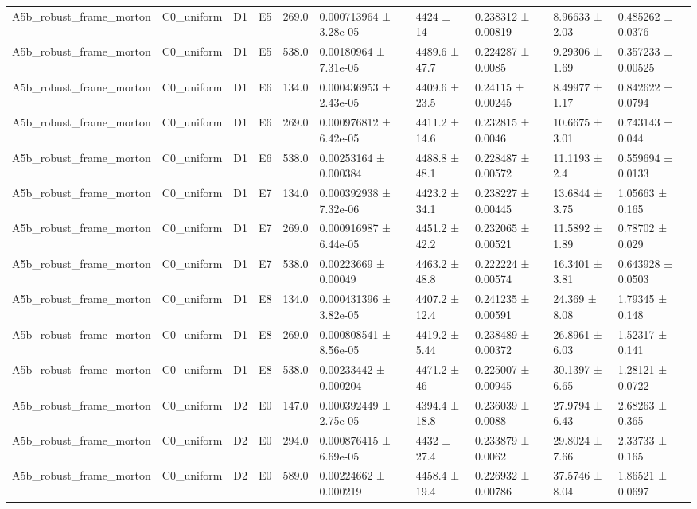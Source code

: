 \begin{table}
\begin{tabular}{llllllllll}
A5b\_robust\_frame\_morton & C0\_uniform & D1 & E5 & 269.0 & 0.000713964 ± 3.28e-05 & 4424 ± 14 & 0.238312 ± 0.00819 & 8.96633 ± 2.03 & 0.485262 ± 0.0376 \\
A5b\_robust\_frame\_morton & C0\_uniform & D1 & E5 & 538.0 & 0.00180964 ± 7.31e-05 & 4489.6 ± 47.7 & 0.224287 ± 0.0085 & 9.29306 ± 1.69 & 0.357233 ± 0.00525 \\
A5b\_robust\_frame\_morton & C0\_uniform & D1 & E6 & 134.0 & 0.000436953 ± 2.43e-05 & 4409.6 ± 23.5 & 0.24115 ± 0.00245 & 8.49977 ± 1.17 & 0.842622 ± 0.0794 \\
A5b\_robust\_frame\_morton & C0\_uniform & D1 & E6 & 269.0 & 0.000976812 ± 6.42e-05 & 4411.2 ± 14.6 & 0.232815 ± 0.0046 & 10.6675 ± 3.01 & 0.743143 ± 0.044 \\
A5b\_robust\_frame\_morton & C0\_uniform & D1 & E6 & 538.0 & 0.00253164 ± 0.000384 & 4488.8 ± 48.1 & 0.228487 ± 0.00572 & 11.1193 ± 2.4 & 0.559694 ± 0.0133 \\
A5b\_robust\_frame\_morton & C0\_uniform & D1 & E7 & 134.0 & 0.000392938 ± 7.32e-06 & 4423.2 ± 34.1 & 0.238227 ± 0.00445 & 13.6844 ± 3.75 & 1.05663 ± 0.165 \\
A5b\_robust\_frame\_morton & C0\_uniform & D1 & E7 & 269.0 & 0.000916987 ± 6.44e-05 & 4451.2 ± 42.2 & 0.232065 ± 0.00521 & 11.5892 ± 1.89 & 0.78702 ± 0.029 \\
A5b\_robust\_frame\_morton & C0\_uniform & D1 & E7 & 538.0 & 0.00223669 ± 0.00049 & 4463.2 ± 48.8 & 0.222224 ± 0.00574 & 16.3401 ± 3.81 & 0.643928 ± 0.0503 \\
A5b\_robust\_frame\_morton & C0\_uniform & D1 & E8 & 134.0 & 0.000431396 ± 3.82e-05 & 4407.2 ± 12.4 & 0.241235 ± 0.00591 & 24.369 ± 8.08 & 1.79345 ± 0.148 \\
A5b\_robust\_frame\_morton & C0\_uniform & D1 & E8 & 269.0 & 0.000808541 ± 8.56e-05 & 4419.2 ± 5.44 & 0.238489 ± 0.00372 & 26.8961 ± 6.03 & 1.52317 ± 0.141 \\
A5b\_robust\_frame\_morton & C0\_uniform & D1 & E8 & 538.0 & 0.00233442 ± 0.000204 & 4471.2 ± 46 & 0.225007 ± 0.00945 & 30.1397 ± 6.65 & 1.28121 ± 0.0722 \\
A5b\_robust\_frame\_morton & C0\_uniform & D2 & E0 & 147.0 & 0.000392449 ± 2.75e-05 & 4394.4 ± 18.8 & 0.236039 ± 0.0088 & 27.9794 ± 6.43 & 2.68263 ± 0.365 \\
A5b\_robust\_frame\_morton & C0\_uniform & D2 & E0 & 294.0 & 0.000876415 ± 6.69e-05 & 4432 ± 27.4 & 0.233879 ± 0.0062 & 29.8024 ± 7.66 & 2.33733 ± 0.165 \\
A5b\_robust\_frame\_morton & C0\_uniform & D2 & E0 & 589.0 & 0.00224662 ± 0.000219 & 4458.4 ± 19.4 & 0.226932 ± 0.00786 & 37.5746 ± 8.04 & 1.86521 ± 0.0697 \\

\end{tabular}
\end{table}
